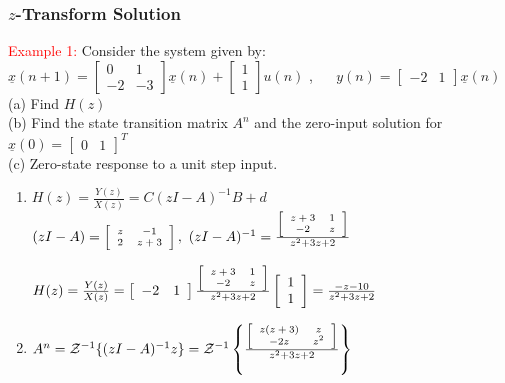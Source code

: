 \documentclass[mathserif, 10pt]{beamer} %
\def\x{\underline{x}}
\begin{document}
\frame
{

\renewcommand{\theenumi}{\alph{enumi}}
\frametitle{$z$-Transform Solution}

\textcolor{red}{Example 1: } Consider the system given by:\\
$\x(n+1) = \left[
\begin{array}{cc}
	0&1\\
	-2&-3
\end{array} \right] \x(n) + \left[
\begin{array}{c}
	1\\
	1
\end{array} \right] u(n)$ ,  ~~
$y(n) = \left[
\begin{array}{cc}
	-2 & 1
\end{array} \right] \x(n)$\\
(a) Find $H(z)$\\
(b) Find the state transition matrix $A^n$ and the zero-input solution for $\x(0)=\left[
\begin{array}{cc}
	0 & 1
\end{array} \right]^T$  \\
(c) Zero-state response to a unit step input. 
\begin{enumerate}
\item $H(z) =\frac{Y(z)}{X(z)} = C(zI-A)^{-1}B+d$\\
$(zI-A) = \left[
\scriptsize{\begin{array}{cc}
	z&-1\\
	2&z+3
\end{array}} \right],~(zI-A)^{-1} = \frac{\left[
\scriptsize{\begin{array}{cc}
	 z+3&1\\
	-2&z
\end{array}} \right]}{z^2+3z+2}$

$H(z) = \frac{Y(z)}{X(z)} = \left[
\begin{array}{cc}
	-2& 1
\end{array} \right] \frac{\left[
\scriptsize{\begin{array}{cc}
	 z+3&1\\
	-2&z
\end{array}} \right]}{z^2+3z+2} \left[
\begin{array}{c}
	1\\
	1
\end{array} \right] = \frac{-z-10}{z^2+3z+2}$\\

\item $A^n = \mathcal{Z}^{-1}\{(zI-A)^{-1}z\} = \mathcal{Z}^{-1}\left\{ \frac{\left[
\scriptsize{\begin{array}{cc}
	z(z+3)&z\\
	-2z&z^2
\end{array}} \right]}{z^2+3z+2} \right \}$\\

\end{enumerate}

}
\end{document}
